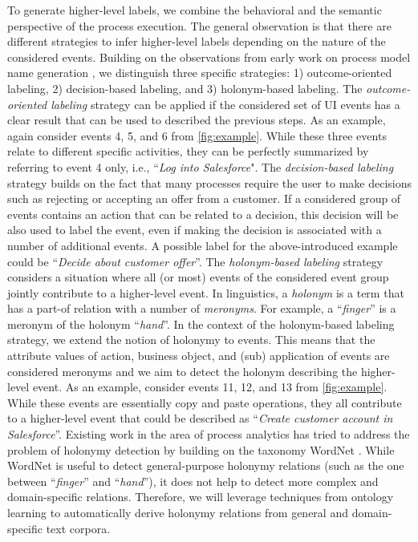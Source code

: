  To generate higher-level labels, we combine the behavioral and the semantic perspective of the process execution. The general observation is that there are different strategies to infer higher-level labels depending on the nature of the considered events. Building on the observations from early work on process model name generation \cite{leopold2014simplifying}, we distinguish three specific strategies: 1) outcome-oriented labeling, 2) decision-based labeling, and 3) holonym-based labeling. The \textit{outcome-oriented labeling} strategy can be applied if the considered set of UI events has a clear result that can be used to described the previous steps. As an example, again consider events 4, 5, and 6 from \autoref{fig:example}. While these three events relate to different specific activities, they can be perfectly summarized by referring to event 4 only, i.e., ``\textit{Log into Salesforce}". The \textit{decision-based labeling} strategy builds on the fact that many processes require the user to make decisions such as rejecting or accepting an offer from a customer. If a considered group of events contains an action that can be related to a decision, this decision will be also used to label the event, even if making the decision is associated with a number of additional events. A possible label for the above-introduced example could be ``\textit{Decide about customer offer}''. The \textit{holonym-based labeling} strategy considers a situation where all (or most) events of the considered event group jointly contribute to a higher-level event. In linguistics, a \textit{holonym} is a term that has a part-of relation with a number of \textit{meronyms}. For example, a ``\textit{finger}'' is a meronym of the holonym ``\textit{hand}''. In the context of the holonym-based labeling strategy, we extend the notion of holonymy to events. This means that the attribute values of action, business object, and (sub) application of events are considered meronyms and we aim to detect the holonym describing the higher-level event. As an example, consider events 11, 12, and 13 from \autoref{fig:example}. While these events are essentially copy and paste operations, they all contribute to a higher-level event that could be described as ``\textit{Create customer account in Salesforce}''. Existing work in the area of process analytics has tried to address the problem of holonymy detection by building on the taxonomy WordNet \cite{leopold2014simplifying}. While WordNet is useful to detect general-purpose holonymy relations (such as the one between ``\textit{finger}'' and ``\textit{hand}''), it does not help to detect more complex and domain-specific relations. Therefore, we will leverage techniques from ontology learning \cite{al2020automatic,wong2012ontology} to automatically derive holonymy relations from general and domain-specific text corpora.    

